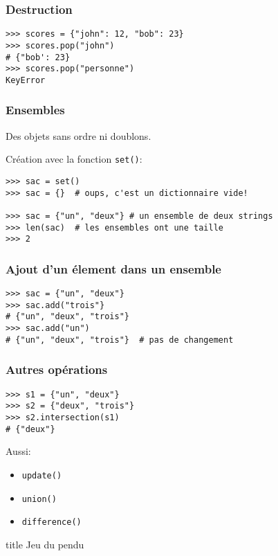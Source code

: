 \documentclass{beamer}
\begin{document}
\begin{frame}[fragile]
  \frametitle{Destruction}

\begin{lstlisting}
>>> scores = {"john": 12, "bob": 23}
>>> scores.pop("john")
# {"bob': 23}
>>> scores.pop("personne")
KeyError
\end{lstlisting}

\end{frame}

\begin{frame}[fragile]
  \frametitle{Ensembles}
Des objets sans ordre ni doublons.

Création avec la fonction \texttt{set()}:

\begin{lstlisting}
>>> sac = set()
>>> sac = {}  # oups, c'est un dictionnaire vide!

>>> sac = {"un", "deux"} # un ensemble de deux strings
>>> len(sac)  # les ensembles ont une taille
>>> 2
\end{lstlisting}
\end{frame}

\begin{frame}[fragile]
  \frametitle{Ajout d'un élement dans un ensemble}
\begin{lstlisting}
>>> sac = {"un", "deux"}
>>> sac.add("trois"}
# {"un", "deux", "trois"}
>>> sac.add("un")
# {"un", "deux", "trois"}  # pas de changement
\end{lstlisting}
\end{frame}

\begin{frame}[fragile]
  \frametitle{Autres opérations}
\begin{lstlisting}
>>> s1 = {"un", "deux"}
>>> s2 = {"deux", "trois"}
>>> s2.intersection(s1)
# {"deux"}
\end{lstlisting}

Aussi:

\begin{itemize}
  \item \texttt{update()}
  \item \texttt{union()}
  \item \texttt{difference()}
\end{itemize}
\end{frame}

\begin{frame}[fragile]

  \begin{beamercolorbox}[sep=8pt,center,shadow=true,rounded=true]{title}
    Jeu du pendu
  \end{beamercolorbox}
\end{frame}
\end{document}
